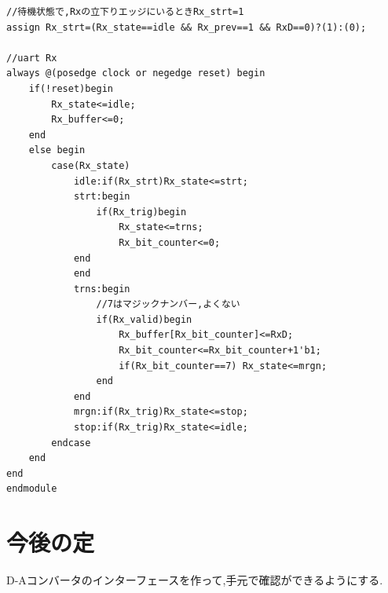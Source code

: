 \documentclass[a4paper,12pt]{article}
\begin{document}
\begin{lstlisting}
//待機状態で,Rxの立下りエッジにいるときRx_strt=1
assign Rx_strt=(Rx_state==idle && Rx_prev==1 && RxD==0)?(1):(0);

//uart Rx
always @(posedge clock or negedge reset) begin
    if(!reset)begin
        Rx_state<=idle;
        Rx_buffer<=0;
    end
    else begin
        case(Rx_state)
            idle:if(Rx_strt)Rx_state<=strt;
            strt:begin
                if(Rx_trig)begin
                    Rx_state<=trns;
                    Rx_bit_counter<=0;
            end
            end
            trns:begin
                //7はマジックナンバー,よくない
                if(Rx_valid)begin
                    Rx_buffer[Rx_bit_counter]<=RxD;
                    Rx_bit_counter<=Rx_bit_counter+1'b1;
                    if(Rx_bit_counter==7) Rx_state<=mrgn;
                end
            end
            mrgn:if(Rx_trig)Rx_state<=stop;
            stop:if(Rx_trig)Rx_state<=idle;
        endcase
    end
end
endmodule
\end{lstlisting}

\section{今後の定}
\begin{multicols}{2}
D-Aコンバータのインターフェースを作って,手元で確認ができるようにする.
\end{multicols}
\end{document}
